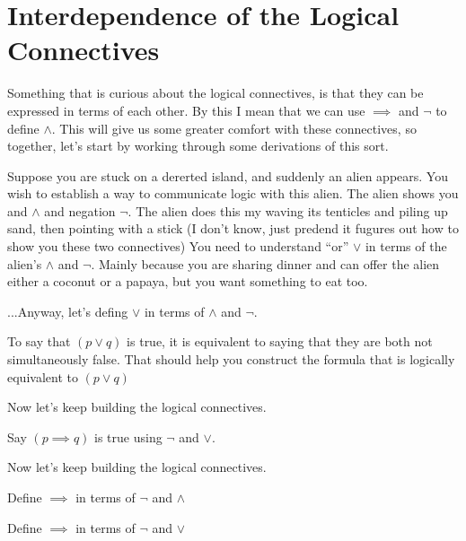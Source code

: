 \section{Interdependence of the Logical Connectives}
Something that is curious about the logical connectives, is that they can be expressed in terms of each other.  By this I mean that we can use $\implies$ and $\neg$ to define $\land$.  This will give us some greater comfort with these connectives, so together, let's start by working through some derivations of this sort. 

\begin{example}
Suppose you are stuck on a dererted island, and suddenly an alien appears.  You wish to establish a way to communicate logic with this alien.  The alien shows you and $\land$ and negation $\neg$. The alien does this my waving its tenticles and piling up sand, then pointing with a stick (I don't know, just predend it fugures out how to show you these two connectives) You need to understand ``or''  $\lor$ in terms of the alien's $\land$ and $\neg$.  Mainly because you are sharing dinner and can offer the alien either a coconut or a papaya, but you want something to eat too.

...Anyway, let's defing $\lor$ in terms of $\land$ and $\neg$.
\end{example}

\begin{problem}
To say that $(p \lor q)$ is true, it is equivalent to saying that they are both not simultaneously false. That should help you construct the formula that is logically equivalent to $(p \lor q)$

\end{problem}

Now let's keep building the logical connectives.
\begin{problem}
Say $(p \implies q)$ is true using $\neg$ and $\lor$.
\end{problem}

Now let's keep building the logical connectives.
\begin{problem}
Define $\implies$ in terms of $\neg$ and $\land$
\end{problem}

\begin{problem}
Define $\implies$ in terms of $\neg$ and $\lor$
\end{problem}

